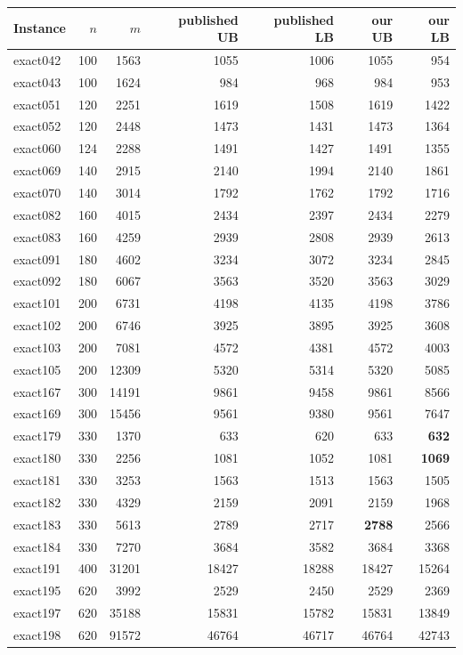 \begin{tabular}{lrrrrrr}
\toprule
Instance & $n$ & $m$ & published UB & published LB & our UB & our LB\\
\midrule
exact042 & 100 & 1563 & 1055 & 1006 & 1055 & 954\\
exact043 & 100 & 1624 & 984 & 968 & 984 & 953\\
exact051 & 120 & 2251 & 1619 & 1508 & 1619 & 1422\\
exact052 & 120 & 2448 & 1473 & 1431 & 1473 & 1364\\
exact060 & 124 & 2288 & 1491 & 1427 & 1491 & 1355\\
exact069 & 140 & 2915 & 2140 & 1994 & 2140 & 1861\\
exact070 & 140 & 3014 & 1792 & 1762 & 1792 & 1716\\
exact082 & 160 & 4015 & 2434 & 2397 & 2434 & 2279\\
exact083 & 160 & 4259 & 2939 & 2808 & 2939 & 2613\\
exact091 & 180 & 4602 & 3234 & 3072 & 3234 & 2845\\
exact092 & 180 & 6067 & 3563 & 3520 & 3563 & 3029\\
exact101 & 200 & 6731 & 4198 & 4135 & 4198 & 3786\\
exact102 & 200 & 6746 & 3925 & 3895 & 3925 & 3608\\
exact103 & 200 & 7081 & 4572 & 4381 & 4572 & 4003\\
exact105 & 200 & 12309 & 5320 & 5314 & 5320 & 5085\\
exact167 & 300 & 14191 & 9861 & 9458 & 9861 & 8566\\
exact169 & 300 & 15456 & 9561 & 9380 & 9561 & 7647\\
exact179 & 330 & 1370 & 633 & 620 & 633 & \textbf{632}\\
exact180 & 330 & 2256 & 1081 & 1052 & 1081 & \textbf{1069}\\
exact181 & 330 & 3253 & 1563 & 1513 & 1563 & 1505\\
exact182 & 330 & 4329 & 2159 & 2091 & 2159 & 1968\\
exact183 & 330 & 5613 & 2789 & 2717 & \textbf{2788} & 2566\\
exact184 & 330 & 7270 & 3684 & 3582 & 3684 & 3368\\
exact191 & 400 & 31201 & 18427 & 18288 & 18427 & 15264\\
exact195 & 620 & 3992 & 2529 & 2450 & 2529 & 2369\\
exact197 & 620 & 35188 & 15831 & 15782 & 15831 & 13849\\
exact198 & 620 & 91572 & 46764 & 46717 & 46764 & 42743\\
\bottomrule
\end{tabular}
